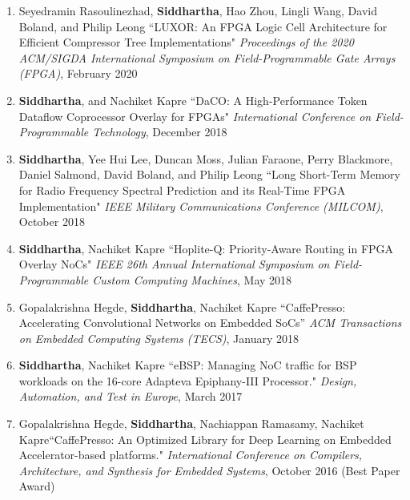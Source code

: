 \documentclass[10pt]{article}
\begin{document}
\begin{enumerate}
    \item Seyedramin Rasoulinezhad, {\bf Siddhartha}, Hao Zhou, Lingli Wang, David Boland, and Philip Leong ``LUXOR: An FPGA Logic Cell Architecture for Efficient Compressor Tree Implementations" \emph{Proceedings of the 2020 ACM/SIGDA International Symposium on Field-Programmable Gate Arrays (FPGA)}, February 2020
    \item {\bf Siddhartha}, and Nachiket Kapre ``DaCO: A High-Performance Token Dataflow Coprocessor Overlay for FPGAs" \emph{International Conference on Field-Programmable Technology}, December 2018
    \item {\bf Siddhartha}, Yee Hui Lee, Duncan Moss, Julian Faraone, Perry Blackmore, Daniel Salmond, David Boland, and Philip Leong ``Long Short-Term Memory for Radio Frequency Spectral Prediction and its Real-Time FPGA Implementation" \emph{IEEE Military Communications Conference (MILCOM)}, October 2018
    \item {\bf Siddhartha}, Nachiket Kapre ``Hoplite-Q: Priority-Aware Routing in FPGA Overlay NoCs" \emph{IEEE 26th Annual International Symposium on Field-Programmable Custom Computing Machines}, May 2018
    \item Gopalakrishna Hegde, {\bf Siddhartha}, Nachiket Kapre ``CaffePresso: Accelerating Convolutional Networks on Embedded SoCs'' \emph{ACM Transactions on Embedded Computing Systems (TECS)}, January 2018
    \item {\bf Siddhartha}, Nachiket Kapre ``eBSP: Managing NoC traffic for BSP workloads on the 16-core Adapteva Epiphany-III Processor." \emph{Design, Automation, and Test in Europe}, March 2017
    \item Gopalakrishna Hegde, \textbf{Siddhartha}, Nachiappan Ramasamy, Nachiket Kapre\newline``CaffePresso: An Optimized Library for Deep Learning on Embedded Accelerator-based platforms." \emph{International Conference on Compilers, Architecture, and Synthesis for Embedded Systems}, October 2016 (Best Paper Award)

\end{enumerate}
\end{document}
